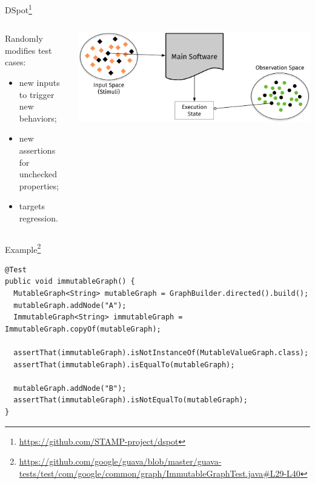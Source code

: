 \documentclass[aspectratio=169]{beamer}
\begin{document}
\begin{frame}{DSpot\footnote{\url{https://github.com/STAMP-project/dspot}}}
  \begin{columns}
    \begin{column}{0.5\textwidth}
      Randomly modifies test cases:
      \begin{itemize}[<+(1)->]
        \item new inputs to trigger new behaviors;
        \item new assertions for unchecked properties;
        \item targets regression.
      \end{itemize}
    \end{column}
    \begin{column}{0.5\textwidth}
      \hspace*{-0.05\textwidth}
      \includegraphics[width=1.1\textwidth]{spaces.pdf}
    \end{column}
  \end{columns}
  \vfill{}
\end{frame}

\begin{frame}[fragile]{Example\footnote{\href{https://github.com/google/guava/blob/ea66419b6aa52678816df77caa304e617255cca5/guava-tests/test/com/google/common/graph/ImmutableGraphTest.java\#L29-L40}{https://github.com/google/guava/blob/master/guava-tests/test/com/google/common/graph/ImmutableGraphTest.java\#L29-L40}}}
  \begin{verbatim}
@Test
public void immutableGraph() {
  MutableGraph<String> mutableGraph = GraphBuilder.directed().build();
  mutableGraph.addNode("A");
  ImmutableGraph<String> immutableGraph = ImmutableGraph.copyOf(mutableGraph);

  assertThat(immutableGraph).isNotInstanceOf(MutableValueGraph.class);
  assertThat(immutableGraph).isEqualTo(mutableGraph);

  mutableGraph.addNode("B");
  assertThat(immutableGraph).isNotEqualTo(mutableGraph);
}
  \end{verbatim}
\end{frame}
\end{document}
